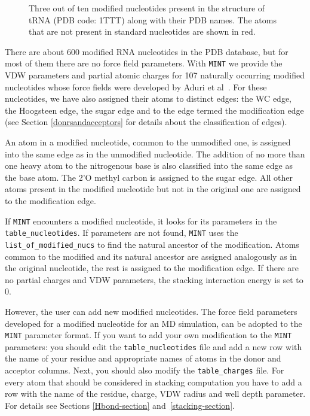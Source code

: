 \documentclass[12pt]{article}
\begin{document}
\begin{figure}[h!]
\begin{center}
\end{center}
\caption{Three out of ten modified nucleotides present in the structure of tRNA (PDB code: 1TTT) along with their PDB names. The atoms that are not present in standard nucleotides are shown in red.}
\label{ModifiedNucleotides}
\end{figure}

There are about 600 modified RNA nucleotides in the PDB database, but for most of them there are no force field parameters. With {\tt MINT} we provide the VDW parameters and partial atomic charges for 107 naturally occurring modified nucleotides whose force fields were developed by Aduri et al~\cite{Aduri_2007}. For these nucleotides, we have also assigned their atoms to distinct edges: the WC edge, the Hoogsteen edge, the sugar edge and to the edge termed the modification edge (see Section \ref{donrsandacceptors} for details about the classification of edges). 

An atom in a modified nucleotide, common to the unmodified one, is assigned into the same edge as in the unmodified nucleotide. The addition of no more than one heavy atom to the nitrogenous base is also classified into the same edge as the base atom. The 2'O methyl carbon is assigned to the sugar edge. All other atoms present in the modified nucleotide but not in the original one are assigned to the modification edge.

If {\tt MINT} encounters a modified nucleotide, it looks for its parameters in the {\tt table\_nucleotides}. If parameters are not found, {\tt MINT} uses the {\tt list\_of\_modified\_nucs} to find the natural ancestor of the modification. Atoms common to the modified and its natural ancestor are assigned analogously as in the original nucleotide, the rest is assigned to the modification edge. If there are no partial charges and VDW parameters, the stacking interaction energy is set to 0.

However, the user can add new modified nucleotides. The force field parameters developed for a modified nucleotide for an MD simulation, can be adopted to the {\tt MINT} parameter format. If you want to add your own modification to the {\tt MINT} parameters: you should edit the {\tt table\_nucleotides} file and add a new row with the name of your residue and appropriate names of atoms in the donor and acceptor columns. Next, you should also modify the {\tt table\_charges} file. For every atom that should be considered in stacking computation you have to add a row with the name of the residue, charge, VDW radius and well depth parameter. For details see Sections \ref{Hbond-section} and~\ref{stacking-section}.
\end{document}
